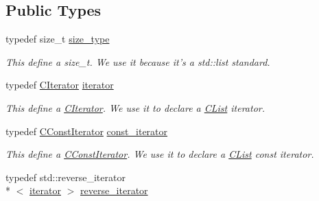 \subsection*{Public Types}
\begin{DoxyCompactItemize}
\item 
\hypertarget{classnsSdD_1_1CList_a91d4b6b8c89816da277ee27d32df5478}{typedef size\+\_\+t \hyperlink{classnsSdD_1_1CList_a91d4b6b8c89816da277ee27d32df5478}{size\+\_\+type}}\label{classnsSdD_1_1CList_a91d4b6b8c89816da277ee27d32df5478}

\begin{DoxyCompactList}\small\item\em This define a {\ttfamily size\+\_\+t}. We use it because it's a std\+::list standard. \end{DoxyCompactList}\item 
\hypertarget{classnsSdD_1_1CList_afdaca29586106fc15940d8529f4990f8}{typedef \hyperlink{structnsSdD_1_1CList_1_1CIterator}{C\+Iterator} \hyperlink{classnsSdD_1_1CList_afdaca29586106fc15940d8529f4990f8}{iterator}}\label{classnsSdD_1_1CList_afdaca29586106fc15940d8529f4990f8}

\begin{DoxyCompactList}\small\item\em This define a {\ttfamily \hyperlink{structnsSdD_1_1CList_1_1CIterator}{C\+Iterator}}. We use it to declare a \hyperlink{classnsSdD_1_1CList}{C\+List} iterator. \end{DoxyCompactList}\item 
\hypertarget{classnsSdD_1_1CList_ae323732a26e507146686556fb775767a}{typedef \hyperlink{structnsSdD_1_1CList_1_1CConstIterator}{C\+Const\+Iterator} \hyperlink{classnsSdD_1_1CList_ae323732a26e507146686556fb775767a}{const\+\_\+iterator}}\label{classnsSdD_1_1CList_ae323732a26e507146686556fb775767a}

\begin{DoxyCompactList}\small\item\em This define a {\ttfamily \hyperlink{structnsSdD_1_1CList_1_1CConstIterator}{C\+Const\+Iterator}}. We use it to declare a \hyperlink{classnsSdD_1_1CList}{C\+List} const iterator. \end{DoxyCompactList}\item 
\hypertarget{classnsSdD_1_1CList_a5582eb88a5f625ef426f534ea5556311}{typedef std\+::reverse\+\_\+iterator\\*
$<$ \hyperlink{classnsSdD_1_1CList_afdaca29586106fc15940d8529f4990f8}{iterator} $>$ \hyperlink{classnsSdD_1_1CList_a5582eb88a5f625ef426f534ea5556311}{reverse\+\_\+iterator}}\label{classnsSdD_1_1CList_a5582eb88a5f625ef426f534ea5556311}


\end{DoxyCompactItemize}
